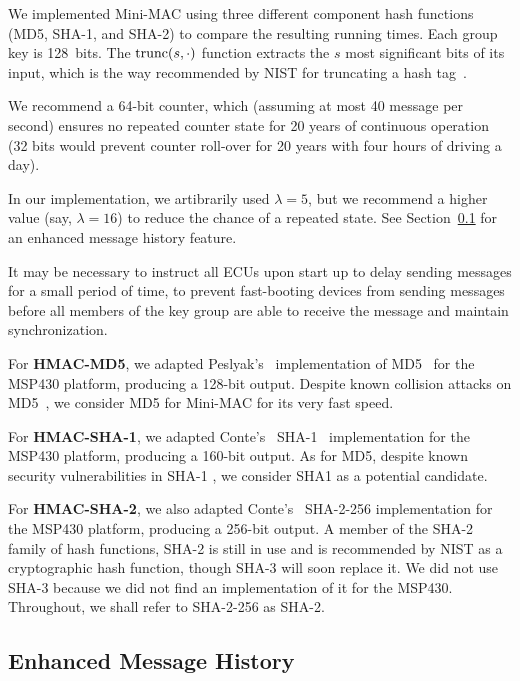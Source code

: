 We implemented Mini-MAC using three different component hash functions (MD5, SHA-1, and SHA-2) to compare the resulting running times.  
Each group key is 128~bits.  The $\hbox{trunc}(s,\cdot)$ function extracts 
the $s$ most significant bits of its input, which is the way recommended by NIST
for truncating a hash tag~\cite{nist107}.

We recommend a 64-bit counter, which (assuming at most 40 message per second) ensures no repeated counter state for 20 years
of continuous operation (32 bits would prevent counter roll-over for 20 years with four hours of driving a day).

In our implementation, we artibrarily used $\lambda = 5$, 
but we recommend a higher value (say, $\lambda = 16$) to reduce the chance of a repeated state.
See Section~\ref{history} for an enhanced message history feature.

It may be necessary to instruct all ECUs upon start up to delay sending messages 
for a small period of time, to prevent fast-booting devices from sending messages 
before all members of the key group are able to receive the message and maintain synchronization.

For \textbf{HMAC-MD5},
we adapted Peslyak's~\cite{Peslyak} implementation of MD5~\cite{MD5} for the MSP430 platform, producing a 128-bit output. 
Despite known collision attacks on MD5~\cite{Wang-MD5}, we consider
MD5 for Mini-MAC for its very fast speed.  

For \textbf{HMAC-SHA-1},
we adapted Conte's~\cite{Conte-SHA1} SHA-1~\cite{FIPS-180-4} implementation for the MSP430 platform, producing a 160-bit output. 
As for MD5, despite known security vulnerabilities in SHA-1 \cite{Wang-SHA1}, 
we consider SHA1 as a potential candidate.


For \textbf{HMAC-SHA-2},
we also adapted Conte's~\cite{Conte-SHA256} SHA-2-256 implementation for the MSP430 platform, producing a 256-bit output. 
A member of the SHA-2 family of hash functions, SHA-2 is still in use and is recommended by NIST as a cryptographic hash function, 
though SHA-3 will soon replace it\cite{FIPS-180-4}. We did not use SHA-3 because we did not find an implementation of it
for the MSP430.  Throughout, we shall refer to SHA-2-256 as SHA-2.


\subsection{Enhanced Message History}
\label{history}

